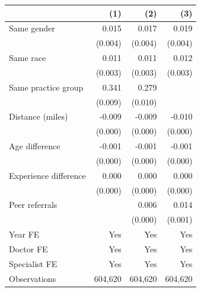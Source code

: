 
\begin{tabular}{lrrr}
\toprule
 & (1) & (2) & (3)\\
\midrule
Same gender & 0.015 & 0.017 & 0.019\\
 & (0.004) & (0.004) & (0.004)\\
Same race & 0.011 & 0.011 & 0.012\\
 & (0.003) & (0.003) & (0.003)\\
Same practice group & 0.341 & 0.279 & \\
 & (0.009) & (0.010) & \\
Distance (miles) & -0.009 & -0.009 & -0.010\\
 & (0.000) & (0.000) & (0.000)\\
Age difference & -0.001 & -0.001 & -0.001\\
 & (0.000) & (0.000) & (0.000)\\
Experience difference & 0.000 & 0.000 & 0.000\\
 & (0.000) & (0.000) & (0.000)\\
Peer referrals &  & 0.006 & 0.014\\
 &  & (0.000) & (0.001)\\
Year FE & Yes & Yes & Yes\\
Doctor FE & Yes & Yes & Yes\\
Specialist FE & Yes & Yes & Yes\\
Observations & 604,620 & 604,620 & 604,620\\
\bottomrule
\end{tabular}
